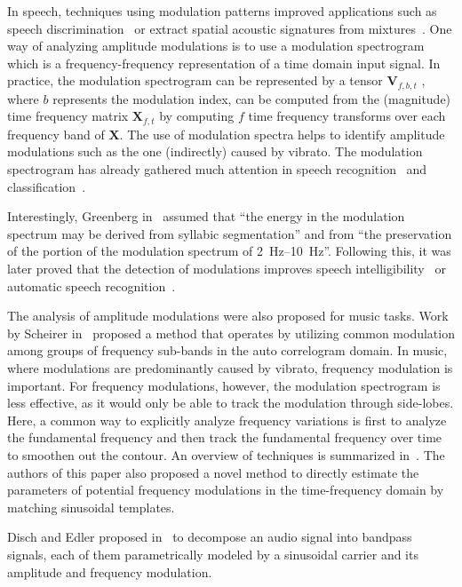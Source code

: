 In speech, techniques using modulation patterns improved applications such as speech  discrimination~\cite{mesgarani04} or extract spatial acoustic signatures from mixtures~\cite{sukittanon06}.
One way of analyzing amplitude modulations is to use a modulation spectrogram~\cite{greenberg97} which is a frequency-frequency representation of a time domain input signal.
In practice, the modulation spectrogram can be represented by a tensor \(\mathbf{V}_{f, b, t}\) , where \(b\) represents the modulation index, can be computed from the (magnitude) time frequency matrix \(\mathbf{X}_{f, t}\) by computing \(f\) time frequency transforms over each frequency band of \(\mathbf{X}\).
The use of modulation spectra helps to identify amplitude modulations such as the one (indirectly) caused by vibrato. 
The modulation spectrogram has already gathered much attention in speech recognition~\cite{greenberg97, kingsbury98} and classification~\cite{kinnunen08, markaki09}.
\par
Interestingly, Greenberg in~\cite{greenberg97} assumed that ``the energy in the modulation spectrum may be derived from syllabic segmentation'' and from ``the preservation of the portion of the modulation spectrum of \SIrange{2}{10}{\hertz}''.
Following this, it was later proved that the detection of modulations improves speech intelligibility~\cite{elhilali03} or automatic speech recognition~\cite{kingsbury98}.
\par
The analysis of amplitude modulations were also proposed for music tasks. 
Work by Scheirer in~\cite{scheirer99} proposed a method that operates by utilizing common modulation among groups of frequency sub-bands in the auto correlogram domain.
In music, where modulations are predominantly caused by vibrato, frequency modulation is important.
For frequency modulations, however, the modulation spectrogram is less effective, as it would only be able to track the modulation through side-lobes.
Here, a common way to explicitly analyze frequency variations is first to analyze the fundamental frequency and then track the fundamental frequency over time to smoothen out the contour.
An overview of techniques is summarized in~\cite{driedger16}.
The authors of this paper also proposed a novel method to directly estimate the parameters of potential frequency modulations in the time-frequency domain by matching sinusoidal templates.
\par
Disch and Edler proposed in~\cite{disch09} to decompose an audio signal into bandpass signals, each of them parametrically modeled by a sinusoidal carrier and its amplitude and frequency modulation.

